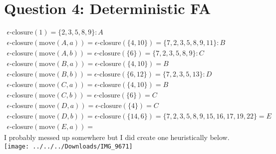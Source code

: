 \documentclass{article}
\begin{document}
\section*{Question 4: Deterministic FA}
\begin{align}
	\epsilon\text{-closure}(1)=\{2,3,5,8,9\}:A
	\\
	\epsilon\text{-closure}(\text{move}(A,a))=\epsilon\text{-closure}(\{4,10\})=\{7,2,3,5,8,9,11\}:B
	\\
	\epsilon\text{-closure}(\text{move}(A,b))=\epsilon\text{-closure}(\{6\})=\{7,2,3,5,8,9\}:C
	\\
	\epsilon\text{-closure}(\text{move}(B,a))=\epsilon\text{-closure}(\{4, 10\})=B
	\\
	\epsilon\text{-closure}(\text{move}(B,b))=\epsilon\text{-closure}(\{6,12\})=\{7,2,3,5,13\}:D
	\\
	\epsilon\text{-closure}(\text{move}(C,a))=\epsilon\text{-closure}(\{4,10\})=B
	\\
	\epsilon\text{-closure}(\text{move}(C,b))=\epsilon\text{-closure}(\{6\})=C
	\\
	\epsilon\text{-closure}(\text{move}(D,a))=\epsilon\text{-closure}(\{4\})=C
	\\
	\epsilon\text{-closure}(\text{move}(D,b))=\epsilon\text{-closure}(\{14,6\})=\{7,2,3,5,8,9,15,16,17,19,22\}=E
	\\
	\epsilon\text{-closure}(\text{move}(E,a))=
\end{align}
I probably messed up somewhere but I did create one heuristically below.
\\
\texttt{[image: ../../../Downloads/IMG\_9671]}
\end{document}
